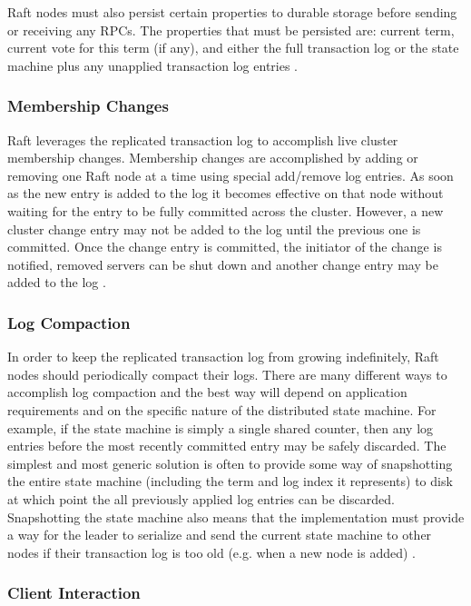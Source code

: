 \documentclass[9pt]{extarticle}
\begin{document}
\begin{multicols}{2}
Raft nodes must also persist certain properties to durable storage
before sending or receiving any RPCs. The properties that must be
persisted are: current term, current vote for this term (if any), and
either the full transaction log or the state machine plus any
unapplied transaction log entries
\cite[Section~3.8]{raft_thesis:ongaro14}.

\subsubsection{Membership Changes}

Raft leverages the replicated transaction log to accomplish live
cluster membership changes. Membership changes are accomplished by
adding or removing one Raft node at a time using special add/remove
log entries. As soon as the new entry is added to the log it becomes
effective on that node without waiting for the entry to be fully
committed across the cluster. However, a new cluster change entry may
not be added to the log until the previous one is committed. Once the
change entry is committed, the initiator of the change is notified,
removed servers can be shut down and another change entry may be added
to the log \cite[Section~4]{raft_thesis:ongaro14}.

\subsubsection{Log Compaction}

In order to keep the replicated transaction log from growing
indefinitely, Raft nodes should periodically compact their logs. There
are many different ways to accomplish log compaction and the best way
will depend on application requirements and on the specific nature of
the distributed state machine. For example, if the state machine is
simply a single shared counter, then any log entries before the most
recently committed entry may be safely discarded. The simplest and
most generic solution is often to provide some way of snapshotting the
entire state machine (including the term and log index it represents)
to disk at which point the all previously applied log entries can be
discarded. Snapshotting the state machine also means that the
implementation must provide a way for the leader to serialize and send
the current state machine to other nodes if their transaction log is
too old (e.g. when a new node is added)
\cite[Section~5]{raft_thesis:ongaro14}.

\subsubsection{Client Interaction}


\end{multicols}
\end{document}

